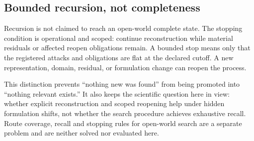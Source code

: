 \subsection{Bounded recursion, not completeness}

Recursion is not claimed to reach an open-world complete state. The stopping condition is operational and scoped: continue reconstruction while material residuals or affected reopen obligations remain. A bounded stop means only that the registered attacks and obligations are flat at the declared cutoff. A new representation, domain, residual, or formulation change can reopen the process.

This distinction prevents ``nothing new was found'' from being promoted into ``nothing relevant exists.'' It also keeps the scientific question here in view: whether explicit reconstruction and scoped reopening help under hidden formulation shifts, not whether the search procedure achieves exhaustive recall. Route coverage, recall and stopping rules for open-world search are a separate problem and are neither solved nor evaluated here.
